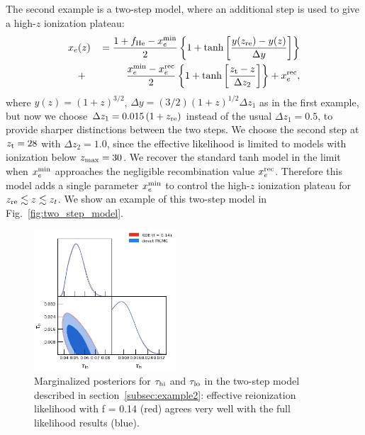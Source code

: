 \documentclass[prd,twocolumn,amsmath,amssymb,floatfix,superscriptaddress,nofootinbib]{revtex4-1}
\newcommand{\refssec}[1]{section~\ref{subsec:#1}}
\newcommand{\zmax}{z_{\rm max}}
\newcommand{\xemin}{x_e^{\rm min}}
\newcommand{\tauhi}{\tau_{\rm hi}}
\newcommand{\taulo}{\tau_{\rm lo}}
\newcommand{\bea}{\begin{eqnarray}}
\newcommand{\eea}{\end{eqnarray}}
\begin{document}
 
The second example is a two-step model, where an additional step is used to give a high-$z$ ionization plateau: 
 \bea
x_e&(z)&\,= \frac{1+f_{\rm He} - \xemin}{2}\left\{  1+ \tanh\left[ \frac{y(z_{\rm re})-y(z)}{\Delta y} \right] \right\} \notag \\
&+& \frac{\xemin - x_e^{\rm rec}}{2}\left\{  1+ \tanh\left[ \frac{z_{\rm t}-z}{\Delta z_{2}} \right] \right\} + x_e^{\rm rec},
 \label{eqn:tanh_highz}
 \eea
where $y(z)=(1+z)^{3/2}$, $\Delta y=(3/2)(1+z)^{1/2}\Delta z_1$ as in the first example, but now we choose $\Delta z_1 = 0.015\, (1+z_{\rm re})$ instead of the usual $\Delta z_1 = 0.5$, to provide sharper distinctions between the two steps.
We choose the second step at $z_{\rm t}=28$ with $\Delta z_2 = 1.0$, since the effective likelihood is limited to models with ionization below $\zmax=30$. 
We recover the standard tanh model in the limit when $\xemin$ approaches the negligible recombination value $x_e^{\rm rec}$.
Therefore this model adds a single parameter $\xemin$ to control the high-$z$ ionization plateau for $z_{\rm re} \lesssim z \lesssim z_t$. We show an example
of this two-step model in Fig.~\ref{fig:two_step_model}.

\begin{figure}[t]
\includegraphics[width=0.47\textwidth]{results/cosmomc_kde/pl18_tanh_highz_test5_run1_vs_relike_tanh_highz_test8_run9_f0p14_taulo_prior_0p03_zre_prior_6p1_taulo_prior_0p0_tri.png}
\caption{Marginalized posteriors for $\tauhi$ and $\taulo$ in the two-step model described in \refssec{example2}: effective reionization likelihood with f = 0.14 (red) agrees very well with the full likelihood results (blue). 
}
\label{fig:two_parameter_model_2D}
\end{figure}
\end{document}
